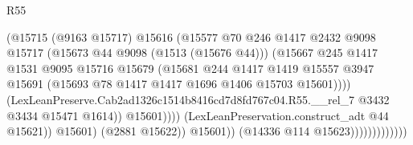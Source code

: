 \begin{lexlean}{R55}
\begin{coremodule}
{{                                              (@15715
                                                (@9163 @15717)
                                                @15616
                                                (@15577
                                                  @70
                                                  @246
                                                  @1417
                                                  @2432
                                                  @9098
                                                  @15717
                                                  (@15673 @44 @9098 (@1513 (@15676 @44)))
                                                  (@15667
                                                    @245
                                                    @1417
                                                    @1531
                                                    @9095
                                                    @15716
                                                    @15679
                                                    (@15681
                                                      @244
                                                      @1417
                                                      @1419
                                                      @15557
                                                      @3947
                                                      @15691
                                                      (@15693
                                                        @78
                                                        @1417
                                                        @1417
                                                        @1696
                                                        @1406
                                                        @15703
                                                        @15601))))
                                                (LexLeanPreserve.Cab2ad1326c1514b8416cd7d8fd767c04.R55.__rel_7
                                                  @3432
                                                  @3434
                                                  @15471
                                                  @1614))
                                              @15601))))
                                      (LexLeanPreservation.construct_adt @44 @15621))
                                    @15601)
                                  (@2881 @15622))
                                @15601))
                            (@14336 @114 @15623)))))))))))))
}}
\end{coremodule}
\end{lexlean}
